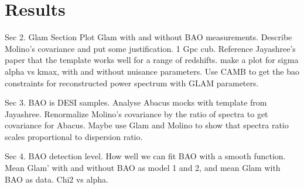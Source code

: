 \section{Results}\label{sec:results}

Sec 2. Glam Section
Plot Glam with and without BAO measurements.
Describe Molino's covariance and put some justification. 1 Gpc cub.
Reference Jayashree's paper that the template works well for a range of redshifts. make a plot for sigma alpha vs kmax, with and without nuisance parameters.
Use CAMB to get the bao constraints for reconstructed power spectrum with GLAM parameters.

Sec 3. BAO is DESI samples. Analyse Abacus mocks with template from Jayashree. Renormalize Molino's covariance by the ratio of spectra to get covariance for Abacus. Maybe use Glam and Molino to show that spectra ratio scales proportional to dispersion ratio.

Sec 4. BAO detection level. How well we can fit BAO with a smooth function. Mean Glam' with and without BAO as model 1 and 2, and mean Glam with BAO as data. Chi2 vs alpha.
